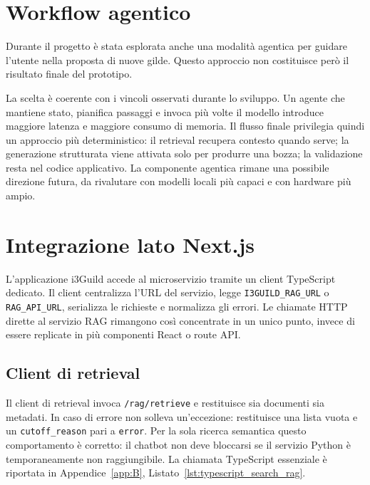 \section{Workflow agentico}
\label{sec:implementation_agentic}

Durante il progetto è stata esplorata anche una modalità agentica per guidare
l'utente nella proposta di nuove gilde. Questo approccio non costituisce però il
risultato finale del prototipo.

La scelta è coerente con i vincoli osservati durante lo sviluppo. Un agente che
mantiene stato, pianifica passaggi e invoca più volte il modello introduce
maggiore latenza e maggiore consumo di memoria. Il flusso finale privilegia quindi un approccio più
deterministico: il retrieval recupera contesto quando serve; la generazione
strutturata viene attivata solo per produrre una bozza; la validazione resta nel
codice applicativo. La componente agentica rimane una possibile direzione
futura, da rivalutare con modelli locali più capaci e con hardware più ampio.

\section{Integrazione lato Next.js}
\label{sec:implementation_nextjs}

L'applicazione i3Guild accede al microservizio tramite un client TypeScript
dedicato. Il client centralizza l'URL del servizio, legge
\texttt{I3GUILD\_RAG\_URL} o \texttt{RAG\_API\_URL}, serializza le richieste e
normalizza gli errori. Le chiamate HTTP dirette al servizio RAG rimangono così
concentrate in un unico punto, invece di essere replicate in più componenti
React o route API.

\subsection{Client di retrieval}
\label{subsec:implementation_nextjs_retrieval}

Il client di retrieval invoca \texttt{/rag/retrieve} e restituisce sia documenti
sia metadati. In caso di errore non solleva
un'eccezione: restituisce una lista vuota e un \texttt{cutoff\_reason} pari a
\texttt{error}. Per la sola ricerca semantica questo comportamento è corretto:
il chatbot non deve bloccarsi se il servizio Python è temporaneamente non
raggiungibile. La chiamata TypeScript essenziale è riportata in
Appendice~\ref{app:B}, Listato~\ref{lst:typescript_search_rag}.

